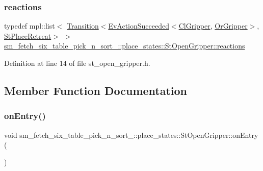 \subsubsection{\texorpdfstring{reactions}{reactions}}
{\footnotesize\ttfamily typedef mpl\+::list$<$ \hyperlink{classsmacc_1_1Transition}{Transition}$<$\hyperlink{structsmacc_1_1default__events_1_1EvActionSucceeded}{Ev\+Action\+Succeeded}$<$\hyperlink{classsm__fetch__six__table__pick__n__sort__1_1_1cl__gripper_1_1ClGripper}{Cl\+Gripper}, \hyperlink{classsm__fetch__six__table__pick__n__sort__1_1_1OrGripper}{Or\+Gripper}$>$, \hyperlink{structsm__fetch__six__table__pick__n__sort__1_1_1place__states_1_1StPlaceRetreat}{St\+Place\+Retreat}$>$ $>$ \hyperlink{structsm__fetch__six__table__pick__n__sort__1_1_1place__states_1_1StOpenGripper_a49f9a5e52b6e2492a9bc3c3a0cb36297}{sm\+\_\+fetch\+\_\+six\+\_\+table\+\_\+pick\+\_\+n\+\_\+sort\+\_\+::place\+\_\+states\+::\+St\+Open\+Gripper\+::reactions}}



Definition at line 14 of file st\+\_\+open\+\_\+gripper.\+h.



\subsection{Member Function Documentation}
\mbox{\label{structsm__fetch__six__table__pick__n__sort__1_1_1place__states_1_1StOpenGripper_addfea02ce1cc2276d23f8ea6dcf4d306}} 
\subsubsection{\texorpdfstring{on\+Entry()}{onEntry()}}
{\footnotesize\ttfamily void sm\+\_\+fetch\+\_\+six\+\_\+table\+\_\+pick\+\_\+n\+\_\+sort\+\_\+::place\+\_\+states\+::\+St\+Open\+Gripper\+::on\+Entry (\begin{DoxyParamCaption}{ }\end{DoxyParamCaption})\hspace{0.3cm}{\ttfamily [inline]}}



